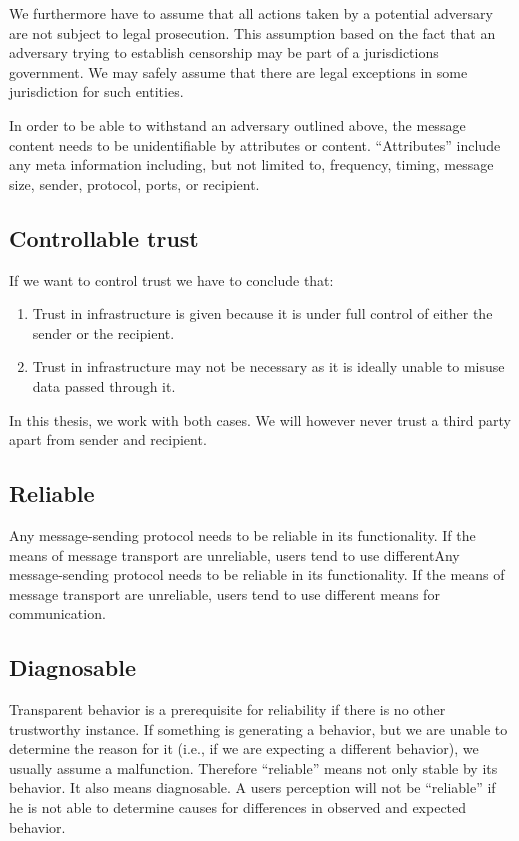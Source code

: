We furthermore have to assume that all actions taken by a potential adversary are not subject to legal prosecution. This assumption based on the fact that an adversary trying to establish censorship may be part of a jurisdictions government. We may safely assume that there are legal exceptions in some jurisdiction for such entities.

In order to be able to withstand an adversary outlined above, the message content needs to be unidentifiable by attributes or content. ``Attributes'' include any meta information including, but not limited to, frequency, timing, message size, sender, protocol, ports, or recipient.

\subsection{Controllable trust}
If we want to control trust we have to conclude that:

\begin{enumerate}
	\item Trust in infrastructure is given because it is under full control of either the sender or the recipient.
	\item Trust in infrastructure may not be necessary as it is ideally unable to misuse data passed through it.
\end{enumerate}

In this thesis, we work with both cases. We will however never trust a third party apart from sender and recipient.

\subsection{Reliable}
Any message-sending protocol needs to be reliable in its functionality. If the means of message transport are unreliable, users tend to use differentAny message-sending protocol needs to be reliable in its functionality. If the means of message transport are unreliable, users tend to use different means for communication. 

\subsection{Diagnosable}
Transparent behavior is a prerequisite for reliability if there is no other trustworthy instance. If something is generating a  behavior, but we are unable to determine the reason for it (i.e., if we are expecting a different behavior), we usually assume a malfunction. Therefore ``reliable'' means not only stable by its behavior. It also means diagnosable. A users perception will not be ``reliable'' if he is not able to determine causes for differences in observed and expected behavior.

